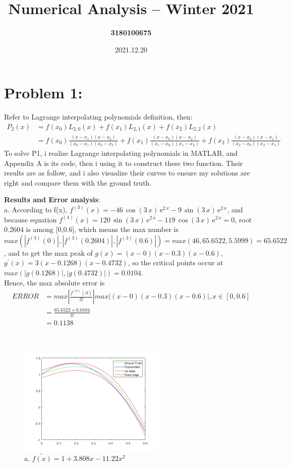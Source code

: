 \documentclass{article}
\title{\textbf{Numerical Analysis – Winter 2021}}
\author{\textbf{3180100675}}
\date{2021.12.20}
\begin{document}
\maketitle

\section{Problem 1:}  
Refer to Lagrange interpolating polynomials definition, then: \\
\begin{equation}
\begin{aligned}
    P_2(x)&=f(x_0)L_{2,0}(x)+f(x_1)L_{2,1}(x)+f(x_2)L_{2,2}(x) \\
    &=f(x_0)\frac{(x-x_1)(x-x_2)}{(x_0-x_1)(x_0-x_2)}+f(x_1)\frac{(x-x_0)(x-x_2)}{(x_1-x_0)(x_1-x_2)}+f(x_2)\frac{(x-x_0)(x-x_1)}{(x_2-x_0)(x_2-x_1)} \nonumber
\end{aligned}
\end{equation}
To solve P1, i realize Lagrange interpolating polynomials in MATLAB, and Appendix A is its code, then i using it to construct these two function. Their results are as follow, and i also visualize their curves to ensure my solutions are right and compare them with the ground truth.

\textbf{Results and Error analysis}: \\
a.
According to f(x), $f^{(3)}(x)=-46\,\cos\left(3\,x\right)\,{\mathrm{e}}^{2\,x}-9\,\sin\left(3\,x\right)\,{\mathrm{e}}^{2\,x}$,
and because equation $f^{(4)}(x)=120\,\sin\left(3\,x\right)\,{\mathrm{e}}^{2\,x}-119\,\cos\left(3\,x\right)\,{\mathrm{e}}^{2\,x}=0$, root 0.2604 is among [0,0.6], which means the max number is $max(|f^{(3)}(0)|,|f^{(3)}(0.2604)|,|f^{(3)}(0.6)|)=max(46,65.6522,5.5999)=65.6522$, and to get the max peak of $g(x)=(x-0)(x-0.3)(x-0.6)$, $g^{'}(x)=3(x-0.1268)(x-0.4732)$, so the critical points occur at $max(|g(0.1268)|,|g(0.4732)|)=0.0104$. \\
Hence, the max absolute error is 
\begin{equation}
\begin{aligned}
    ERROR&=max|\frac{f^{(3)}(\partial)}{3!}| max|(x-0)(x-0.3)(x-0.6)|, x \in [0,0.6] \\
    &=\frac{65.6522 \times 0.0104}{3!} \\
    &=0.1138
    \nonumber
\end{aligned}
\end{equation}

\\
\begin{figure}
\centering
\includegraphics[width=7cm]{P1-a.png}
\caption{a. $\widetilde{f(x)}=1+3.808x-11.22x^2$}
\end{figure}
\end{document}
